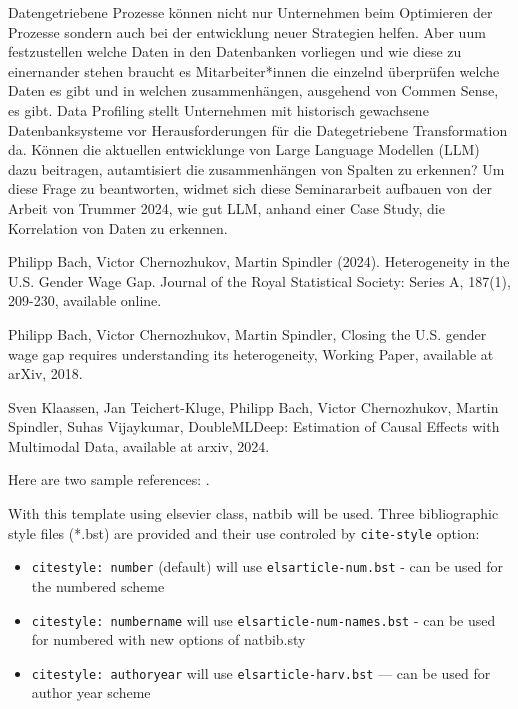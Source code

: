 \documentclass[
  11pt,
  authoryear,
  preprint]{elsarticle}
\providecommand{\tightlist}{%
  \setlength{\itemsep}{0pt}\setlength{\parskip}{0pt}}\usepackage{longtable,booktabs,array}
\begin{document}
Datengetriebene Prozesse können nicht nur Unternehmen beim Optimieren
der Prozesse sondern auch bei der entwicklung neuer Strategien helfen.
Aber uum festzustellen welche Daten in den Datenbanken vorliegen und wie
diese zu einernander stehen braucht es Mitarbeiter*innen die einzelnd
überprüfen welche Daten es gibt und in welchen zusammenhängen, ausgehend
von Commen Sense, es gibt. Data Profiling stellt Unternehmen mit
historisch gewachsene Datenbanksysteme vor Herausforderungen für die
Dategetriebene Transformation da. Können die aktuellen entwicklunge von
Large Language Modellen (LLM) dazu beitragen, autamtisiert die
zusammenhängen von Spalten zu erkennen? Um diese Frage zu beantworten,
widmet sich diese Seminararbeit aufbauen von der Arbeit von Trummer
2024, wie gut LLM, anhand einer Case Study, die Korrelation von Daten zu
erkennen.

Philipp Bach, Victor Chernozhukov, Martin Spindler (2024). Heterogeneity
in the U.S. Gender Wage Gap. Journal of the Royal Statistical Society:
Series A, 187(1), 209-230, available online.

Philipp Bach, Victor Chernozhukov, Martin Spindler, Closing the U.S.
gender wage gap requires understanding its heterogeneity, Working Paper,
available at arXiv, 2018.

Sven Klaassen, Jan Teichert-Kluge, Philipp Bach, Victor Chernozhukov,
Martin Spindler, Suhas Vijaykumar, DoubleMLDeep: Estimation of Causal
Effects with Multimodal Data, available at arxiv, 2024.

\citep{RN5574}

Here are two sample references: \citet{Feynman1963118}
\citet{Dirac1953888}.

With this template using elsevier class, natbib will be used. Three
bibliographic style ﬁles (*.bst) are provided and their use controled by
\texttt{cite-style} option:

\begin{itemize}
\tightlist
\item
  \texttt{citestyle:\ number} (default) will use
  \texttt{elsarticle-num.bst} - can be used for the numbered scheme
\item
  \texttt{citestyle:\ numbername} will use
  \texttt{elsarticle-num-names.bst} - can be used for numbered with new
  options of natbib.sty
\item
  \texttt{citestyle:\ authoryear} will use \texttt{elsarticle-harv.bst}
  --- can be used for author year scheme
\end{itemize}
\end{document}
